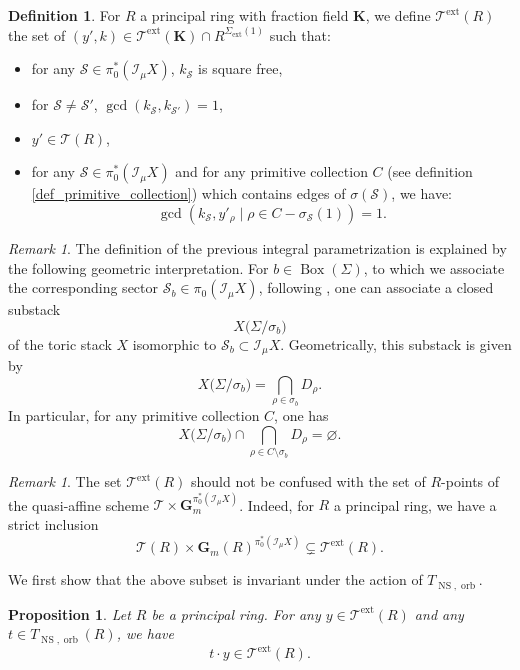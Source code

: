 \documentclass{proc-l}
\newcommand{\K}{\mathbf{K}}
\newcommand{\I}{\mathcal{I}}
\newcommand{\G}{\mathbf{G}}
\DeclareMathOperator{\NS}{NS}
\DeclareMathOperator{\orb}{orb}
\DeclareMathOperator{\Boxe}{Box}
\DeclareMathOperator{\ext}{ext}
\newcommand{\stackS}{\mathcal{S}}
\newcommand{\stackT}{\mathcal{T}}
\newcommand{\sheafI}{\mathcal{I}}
\newcommand{\sector}{\pi_0(\sheafI_{\mu} X)}
\newcommand{\twistsector}{\pi_0^*(\sheafI_{\mu} X)}
\newtheorem{prop}[theorem]{Proposition}
\theoremstyle{definition}
\newtheorem{definition}[theorem]{Definition}
\theoremstyle{remark}
\newtheorem{remark}[theorem]{Remark}
\numberwithin{equation}{section}
\begin{document}
\begin{definition}\label{definition_orb_universal_torsor_gcd_cond}
    For $R$ a principal ring with fraction field $\K$, we define $\stackT^{\ext}(R)$ the set of $(y',k) \in \stackT^{\ext}(\K) \cap R^{\Sigma_{\ext}(1)}$ such that:
    \begin{itemize}
        \item for any $\stackS \in \twistsector $, $k_{\stackS}$ is square free,
        \item for $\stackS \neq \stackS'$, $\gcd(k_{\stackS},k_{\stackS'}) = 1$,
        \item $y' \in \stackT(R)$,
        \item for any $\stackS \in \twistsector $ and for any primitive collection $C$ (see definition \ref{def_primitive_collection}) which contains edges of $\sigma(\stackS)$, we have:
        $$\gcd\left(k_{\stackS},y'_{\rho} \mid \rho \in C - \sigma_{\stackS}(1) \right) = 1 .$$
    \end{itemize}
\end{definition}

\begin{remark}
The definition of the previous integral parametrization is explained by the following geometric interpretation. For $b \in \Boxe(\Sigma)$, to which we associate the corresponding sector $\stackS_b \in \sector$, following \cite[Section~4]{borisov_toric_stack}, one can
associate a closed substack $$X\bigl(\Sigma / \sigma_b\bigr)$$of the toric stack
$X$ isomorphic to $\stackS_b \subset \I_{\mu} X$. Geometrically, this substack is given by
\[
X\bigl(\Sigma / \sigma_b\bigr)
= \bigcap_{\rho \in \sigma_b} D_{\rho}.
\]
In particular, for any primitive collection $C$, one has
\[
X\bigl(\Sigma / \sigma_b\bigr)
\cap
\bigcap_{\rho \in C \setminus \sigma_b} D_{\rho}
= \varnothing.
\]
\end{remark}

\begin{remark}
The set $\stackT^{\ext}(R)$ should not be confused with the set of $R$-points of the quasi-affine scheme $\stackT \times \G_m^{\twistsector}$. Indeed, for $R$ a principal ring, we have a strict inclusion
\[
\stackT(R) \times \G_m(R)^{\twistsector} \subsetneq \stackT^{\ext}(R).
\]
\end{remark}

We first show that the above subset is invariant under the action of $T_{\NS,\orb}$.

\begin{prop}\label{proposition_invariance_ext_param_action_t}
Let $R$ be a principal ring. For any $y \in \stackT^{\ext}(R)$ and any $t \in T_{\NS,\orb}(R)$, we have
\[
t \cdot y \in \stackT^{\ext}(R).
\]
\end{prop}
\end{document}
